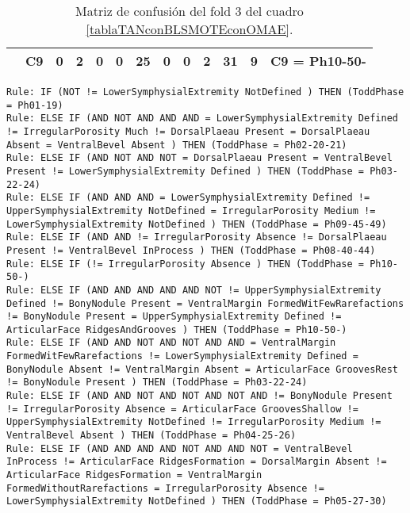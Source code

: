 \begin{table}[H]
{\begin{tabular}{|ccrrrrrrrrrrc|}
\multicolumn{1}{|c|}{}                                      & \multicolumn{1}{c|}{C9} & \multicolumn{1}{c|}{0}  & \multicolumn{1}{c|}{\textbf{2}}  & \multicolumn{1}{c|}{0}  & \multicolumn{1}{c|}{0}  & \multicolumn{1}{c|}{\textbf{25}} & \multicolumn{1}{c|}{0}  & \multicolumn{1}{c|}{0}  & \multicolumn{1}{c|}{\textbf{2}}  & \multicolumn{1}{c|}{\textbf{31}} & \multicolumn{1}{c|}{\textbf{9}}  & C9 = Ph10-50-     \\ \hline
\end{tabular}%
}
\caption{Matriz de confusión del fold 3 del cuadro \ref{tablaTANconBLSMOTEconOMAE}.}

\end{table}

\begin{lstlisting}
Rule: IF (NOT != LowerSymphysialExtremity NotDefined ) THEN (ToddPhase = Ph01-19)
Rule: ELSE IF (AND NOT AND AND AND = LowerSymphysialExtremity Defined != IrregularPorosity Much != DorsalPlaeau Present = DorsalPlaeau Absent = VentralBevel Absent ) THEN (ToddPhase = Ph02-20-21)
Rule: ELSE IF (AND NOT AND NOT = DorsalPlaeau Present = VentralBevel Present != LowerSymphysialExtremity Defined ) THEN (ToddPhase = Ph03-22-24)
Rule: ELSE IF (AND AND AND = LowerSymphysialExtremity Defined != UpperSymphysialExtremity NotDefined = IrregularPorosity Medium != LowerSymphysialExtremity NotDefined ) THEN (ToddPhase = Ph09-45-49)
Rule: ELSE IF (AND AND != IrregularPorosity Absence != DorsalPlaeau Present != VentralBevel InProcess ) THEN (ToddPhase = Ph08-40-44)
Rule: ELSE IF (!= IrregularPorosity Absence ) THEN (ToddPhase = Ph10-50-)
Rule: ELSE IF (AND AND AND AND AND NOT != UpperSymphysialExtremity Defined != BonyNodule Present = VentralMargin FormedWitFewRarefactions != BonyNodule Present = UpperSymphysialExtremity Defined != ArticularFace RidgesAndGrooves ) THEN (ToddPhase = Ph10-50-)
Rule: ELSE IF (AND AND NOT AND NOT AND AND = VentralMargin FormedWitFewRarefactions != LowerSymphysialExtremity Defined = BonyNodule Absent != VentralMargin Absent = ArticularFace GroovesRest != BonyNodule Present ) THEN (ToddPhase = Ph03-22-24)
Rule: ELSE IF (AND AND NOT AND NOT AND NOT AND != BonyNodule Present != IrregularPorosity Absence = ArticularFace GroovesShallow != UpperSymphysialExtremity NotDefined != IrregularPorosity Medium != VentralBevel Absent ) THEN (ToddPhase = Ph04-25-26)
Rule: ELSE IF (AND AND AND AND NOT AND AND NOT = VentralBevel InProcess != ArticularFace RidgesFormation = DorsalMargin Absent != ArticularFace RidgesFormation = VentralMargin FormedWithoutRarefactions = IrregularPorosity Absence != LowerSymphysialExtremity NotDefined ) THEN (ToddPhase = Ph05-27-30)

\end{lstlisting}
